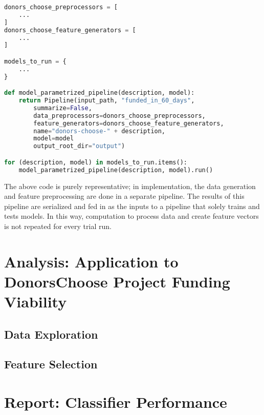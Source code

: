 \documentclass[11pt]{article}
\begin{document}
\begin{lstlisting}[language=Python,numbers=none]
donors_choose_preprocessors = [
    ...
]
donors_choose_feature_generators = [
    ...
]

models_to_run = { 
    ...
}

def model_parametrized_pipeline(description, model):
    return Pipeline(input_path, "funded_in_60_days",
        summarize=False,
        data_preprocessors=donors_choose_preprocessors,
        feature_generators=donors_choose_feature_generators,
        name="donors-choose-" + description,
        model=model
        output_root_dir="output")

for (description, model) in models_to_run.items():
    model_parametrized_pipeline(description, model).run()
\end{lstlisting}

The above code is purely representative; in implementation, the data generation and feature preprocessing are done in a separate pipeline. The results of this pipeline are serialized and fed in as the inputs to a pipeline that solely trains and tests models. In this way, computation to process data and create feature vectors is not repeated for every trial run.


\section{Analysis: Application to DonorsChoose Project Funding Viability}
\subsection{Data Exploration}

\subsection{Feature Selection}

\section{Report: Classifier Performance}
\end{document}
